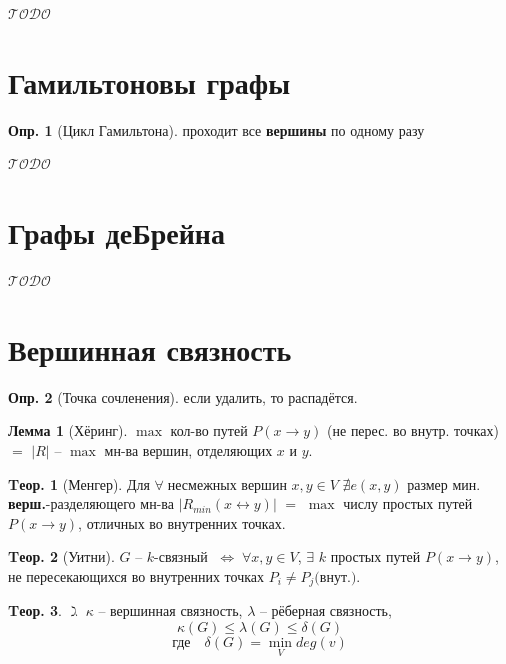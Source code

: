 \documentclass[a4paper,12pt]{article}
\theoremstyle{definition}
\newtheorem{definition}{Опр.}[section]
\theoremstyle{definition}
\newtheorem{theorem}{Tеор.}[section]
\newtheorem{lemma}{Лемма}[section]
\def\ilet{$\gimel\;$}
\def\iiff{$\;\Longleftrightarrow\;$}
\def\iiany{$\forall\;$}
\def\iiTODO{\guillemotleft$\mathcal{TODO}$\guillemotright\textellipsis}
\begin{document}
\iiTODO



\section{Гамильтоновы графы}

\begin{definition}[Цикл Гамильтона] проходит все \textbf{вершины} по одному разу \end{definition}

\iiTODO



\section{Графы деБрейна}

\iiTODO



\section{Вершинная связность}

\begin{definition}[Точка сочленения] если удалить, то распадётся.\end{definition}

\begin{lemma}[Хёринг]
	$\max$ кол-во путей $P(x \rightarrow y)$ (не перес. во внутр. точках) $=$ $|R|$ -- $\max$ мн-ва вершин, отделяющих $x$ и $y$.
\end{lemma}

\begin{theorem}[Менгер]
	Для \iiany несмежных вершин $x,y \in V$ $\nexists e(x,y)$ размер мин. \textbf{верш.}-разделяющего мн-ва $|R_{min}(x \leftrightarrow y)|$ $=$ $\max$ числу простых путей $P(x \rightarrow y)$, отличных во внутренних точках.
\end{theorem}

\begin{theorem}[Уитни]
	$G$ -- $k$-связный \iiff $\forall x,y \in V$, $\exists$ $k$ простых путей $P(x \rightarrow y)$, не пересекающихся во внутренних точках $P_i \neq P_j \text{(внут.)}$.
\end{theorem}

\begin{theorem}
	\ilet $\kappa$ -- вершинная связность, $\lambda$ -- рёберная связность,
	\[ \kappa(G) \leqslant \lambda(G) \leqslant \delta(G) \]
	\[ \text{где} \quad \delta(G) = \min_V deg(v) \]
\end{theorem}
\end{document}
